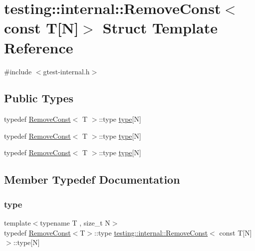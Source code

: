 \hypertarget{structtesting_1_1internal_1_1_remove_const_3_01const_01_t[_n]_4}{}\section{testing\+::internal\+::Remove\+Const$<$ const T\mbox{[}N\mbox{]}$>$ Struct Template Reference}
\label{structtesting_1_1internal_1_1_remove_const_3_01const_01_t[_n]_4}


{\ttfamily \#include $<$gtest-\/internal.\+h$>$}

\subsection*{Public Types}
\begin{DoxyCompactItemize}
\item 
typedef \mbox{\hyperlink{structtesting_1_1internal_1_1_remove_const}{Remove\+Const}}$<$ T $>$\+::type \mbox{\hyperlink{structtesting_1_1internal_1_1_remove_const_3_01const_01_t[_n]_4_ac976b53cb5d031a120fafbe790650068}{type}}\mbox{[}N\mbox{]}
\item 
typedef \mbox{\hyperlink{structtesting_1_1internal_1_1_remove_const}{Remove\+Const}}$<$ T $>$\+::type \mbox{\hyperlink{structtesting_1_1internal_1_1_remove_const_3_01const_01_t[_n]_4_ac976b53cb5d031a120fafbe790650068}{type}}\mbox{[}N\mbox{]}
\item 
typedef \mbox{\hyperlink{structtesting_1_1internal_1_1_remove_const}{Remove\+Const}}$<$ T $>$\+::type \mbox{\hyperlink{structtesting_1_1internal_1_1_remove_const_3_01const_01_t[_n]_4_ac976b53cb5d031a120fafbe790650068}{type}}\mbox{[}N\mbox{]}
\end{DoxyCompactItemize}


\subsection{Member Typedef Documentation}
\mbox{\label{structtesting_1_1internal_1_1_remove_const_3_01const_01_t[_n]_4_ac976b53cb5d031a120fafbe790650068}} 
\subsubsection{\texorpdfstring{type}{type}\hspace{0.1cm}{\footnotesize\ttfamily [1/3]}}
{\footnotesize\ttfamily template$<$typename T , size\+\_\+t N$>$ \\
typedef \mbox{\hyperlink{structtesting_1_1internal_1_1_remove_const}{Remove\+Const}}$<$T$>$\+::type \mbox{\hyperlink{structtesting_1_1internal_1_1_remove_const}{testing\+::internal\+::\+Remove\+Const}}$<$ const T\mbox{[}N\mbox{]}$>$\+::type\mbox{[}N\mbox{]}}

